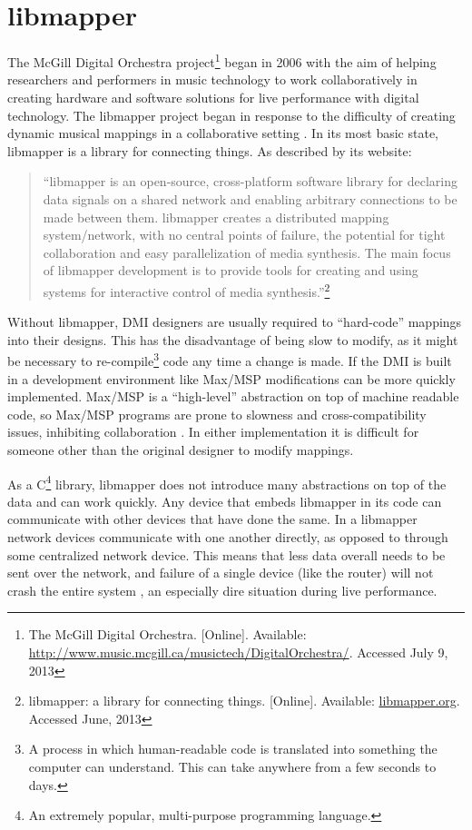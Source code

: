 
\chapter{libmapper}

The McGill Digital Orchestra project\footnote{The McGill Digital Orchestra. [Online]. Available: \url{http://www.music.mcgill.ca/musictech/DigitalOrchestra/}. Accessed July 9, 2013} began in 2006 with the aim of helping researchers  and performers in music technology to work collaboratively in creating hardware and software solutions for live performance with digital technology. The libmapper project began in response to the difficulty of creating dynamic musical mappings in a collaborative setting . In its most basic state, libmapper is a library for connecting things. As described by its website: 

\begin{quote} 
``libmapper is an open-source, cross-platform software library for declaring data signals on a shared network and enabling arbitrary connections to be made between them. libmapper creates a distributed mapping system/network, with no central points of failure, the potential for tight collaboration and easy parallelization of media synthesis. The main focus of libmapper development is to provide tools for creating and using systems for interactive control of media synthesis.''\footnote{libmapper: a library for connecting things. [Online]. Available: \url{libmapper.org}. Accessed June, 2013}
\end{quote}

Without libmapper, DMI designers are usually required to ``hard-code'' mappings into their designs. This has the disadvantage of being slow to modify, as it might be necessary to re-compile\footnote{A process in which human-readable code is translated into something the computer can understand. This can take anywhere from a few seconds to days.} code any time a change is made. If the DMI is built in a development environment like Max/MSP modifications can be more quickly implemented. Max/MSP is a ``high-level'' abstraction on top of machine readable code, so Max/MSP programs are prone to slowness and cross-compatibility issues, inhibiting collaboration . In either implementation it is difficult for someone other than the original designer to modify mappings.

As a C\footnote{An extremely popular, multi-purpose programming language.} library, libmapper does not introduce many abstractions on top of the data and can work quickly. Any device that embeds libmapper in its code can communicate with other devices that have done the same. In a libmapper network devices communicate with one another directly, as opposed to through some centralized network device. This means that less data overall needs to be sent over the network, and failure of a single device (like the router) will not crash the entire system , an especially dire situation during live performance.

